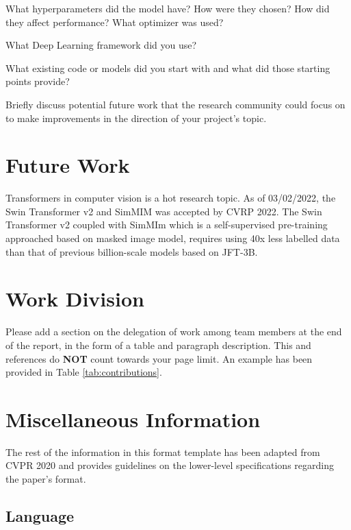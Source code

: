 \documentclass[10pt,twocolumn,letterpaper]{article}
\begin{document}
What hyperparameters did the model have? How were they chosen? How did they affect performance? What optimizer was used? 

What Deep Learning framework did you use? 

What existing code or models did you start with and what did those starting points provide? 

Briefly discuss potential future work that the research community could focus on to make improvements in the direction of your project's topic.

\section{Future Work}

Transformers in computer vision is a hot research topic. As of 03/02/2022, the Swin Transformer v2\cite{liu2021swinV2} and SimMIM\cite{xie2021simmim} was accepted by CVRP 2022. The Swin Transformer v2 coupled with SimMIm which is a self-supervised pre-training approached based on masked image model, requires using 40x less labelled data than that of previous billion-scale models based on JFT-3B\cite{dai2021coatnet}\cite{riquelme2021scaling}\cite{https://doi.org/10.48550/arxiv.2106.04560}.


\section{Work Division}

Please add a section on the delegation of work among team members at the end of the report, in the form of a table and paragraph description. This and references do \textbf{NOT} count towards your page limit. An example has been provided in Table \ref{tab:contributions}.

\newpage
\newpage
\section{Miscellaneous Information}

The rest of the information in this format template has been adapted from CVPR 2020 and provides guidelines on the lower-level specifications regarding the paper's format.

\subsection{Language}
\end{document}
